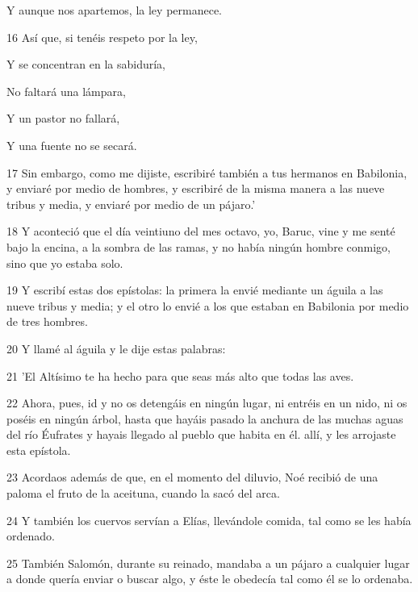 \par Y aunque nos apartemos, la ley permanece.

\par 16 Así que, si tenéis respeto por la ley,

\par Y se concentran en la sabiduría,

\par No faltará una lámpara,

\par Y un pastor no fallará,

\par Y una fuente no se secará.

\par 17 Sin embargo, como me dijiste, escribiré también a tus hermanos en Babilonia, y enviaré por medio de hombres, y escribiré de la misma manera a las nueve tribus y media, y enviaré por medio de un pájaro.'

\par 18 Y aconteció que el día veintiuno del mes octavo, yo, Baruc, vine y me senté bajo la encina, a la sombra de las ramas, y no había ningún hombre conmigo, sino que yo estaba solo.

\par 19 Y escribí estas dos epístolas: la primera la envié mediante un águila a las nueve tribus y media; y el otro lo envié a los que estaban en Babilonia por medio de tres hombres.

\par 20 Y llamé al águila y le dije estas palabras:

\par 21 'El Altísimo te ha hecho para que seas más alto que todas las aves.

\par 22 Ahora, pues, id y no os detengáis en ningún lugar, ni entréis en un nido, ni os poséis en ningún árbol, hasta que hayáis pasado la anchura de las muchas aguas del río Éufrates y hayais llegado al pueblo que habita en él. allí, y les arrojaste esta epístola.

\par 23 Acordaos además de que, en el momento del diluvio, Noé recibió de una paloma el fruto de la aceituna, cuando la sacó del arca.

\par 24 Y también los cuervos servían a Elías, llevándole comida, tal como se les había ordenado.

\par 25 También Salomón, durante su reinado, mandaba a un pájaro a cualquier lugar a donde quería enviar o buscar algo, y éste le obedecía tal como él se lo ordenaba.

